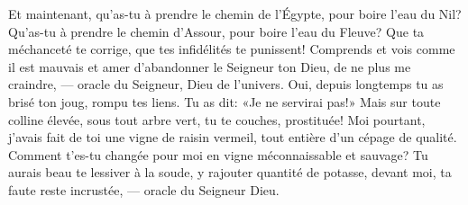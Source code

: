 Et maintenant, qu’as-tu à prendre le chemin de l’Égypte, pour boire l’eau du Nil?
Qu’as-tu à prendre le chemin d’Assour, pour boire l’eau du Fleuve?
Que ta méchanceté te corrige, que tes infidélités te punissent!
	Comprends et vois comme il est mauvais et amer d’abandonner le Seigneur ton Dieu,
	de ne plus me craindre, --- oracle du Seigneur, Dieu de l’univers.
Oui, depuis longtemps tu as brisé ton joug, rompu tes liens.
	Tu as dit: «Je ne servirai pas!»
Mais sur toute colline élevée, sous tout arbre vert,
	tu te couches, prostituée!
Moi pourtant, j’avais fait de toi une vigne de raisin vermeil,
	tout entière d’un cépage de qualité.
Comment t’es-tu changée pour moi en vigne méconnaissable et sauvage?
Tu aurais beau te lessiver à la soude, y rajouter quantité de potasse,
	devant moi, ta faute reste incrustée, --- oracle du Seigneur Dieu.

